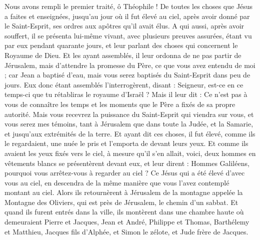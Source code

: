 \begin{multicols}{2}
\VerseOne{}Nous avons rempli le premier traité, ô Théophile ! De toutes les choses que Jésus a faites et enseignées, 
jusqu'au jour où il fut élevé au ciel, après avoir donné par le Saint-Esprit, ses ordres aux apôtres qu'il avait élus.
A qui aussi, après avoir souffert, il se présenta lui-même vivant, avec plusieurs preuves assurées, étant vu par eux pendant quarante jours, et leur parlant des choses qui concernent le Royaume de Dieu.
Et les ayant assemblés, il leur ordonna de ne pas partir de Jérusalem, mais d'attendre la promesse du Père, ce que vous avez entendu de moi ;
car Jean a baptisé d'eau, mais vous serez baptisés du Saint-Esprit dans peu de jours.
Eux donc étant assemblés l'interrogèrent, disant : Seigneur, est-ce en ce temps-ci que tu rétabliras le royaume d'Israël ?
Mais il leur dit : Ce n'est pas à vous de connaître les temps et les moments que le Père a fixés de sa propre autorité.
Mais vous recevrez la puissance du Saint-Esprit qui viendra sur vous, et vous serez mes témoins, tant à Jérusalem que dans toute la Judée, et la Samarie, et jusqu'aux extrémités de la terre.
Et ayant dit ces choses, il fut élevé, comme ils le regardaient, une nuée le pris et l'emporta de devant leurs yeux.
Et comme ils avaient les yeux fixés vers le ciel, à mesure qu'il s'en allait, voici, deux hommes en vêtements blancs se présentèrent devant eux,
et leur dirent : Hommes Galiléens, pourquoi vous arrêtez-vous à regarder au ciel ? Ce Jésus qui a été élevé d'avec vous au ciel, en descendra de la même manière que vous l'avez contemplé montant au ciel.
Alors ils retournèrent à Jérusalem de la montagne appelée la Montagne des Oliviers, qui est près de Jérusalem, le chemin d'un sabbat.
Et quand ils furent entrés dans la ville, ils montèrent dans une chambre haute où demeuraient Pierre et Jacques, Jean et André, Philippe et Thomas, Barthélemy et Matthieu, Jacques fils d'Alphée, et Simon le zélote, et Jude frère de Jacques.

\end{multicols}
